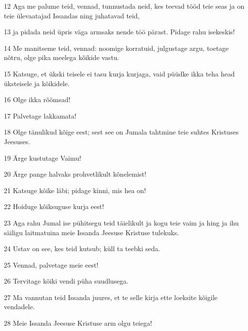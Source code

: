 \par 12 Aga me palume teid, vennad, tunnustada neid, kes teevad tööd teie seas ja on teie ülevaatajad Issandas ning juhatavad teid,
\par 13 ja pidada neid üpris väga armsaks nende töö pärast. Pidage rahu isekeskis!
\par 14 Me manitseme teid, vennad: noomige korratuid, julgustage argu, toetage nõtru, olge pika meelega kõikide vastu.
\par 15 Katsuge, et ükski teisele ei tasu kurja kurjaga, vaid püüdke ikka teha head üksteisele ja kõikidele.
\par 16 Olge ikka rõõmsad!
\par 17 Palvetage lakkamata!
\par 18 Olge tänulikud kõige eest; sest see on Jumala tahtmine teie suhtes Kristuses Jeesuses.
\par 19 Ärge kustutage Vaimu!
\par 20 Ärge pange halvaks prohvetlikult kõnelemist!
\par 21 Katsuge kõike läbi; pidage kinni, mis hea on!
\par 22 Hoiduge kõiksuguse kurja eest!
\par 23 Aga rahu Jumal ise pühitsegu teid täielikult ja kogu teie vaim ja hing ja ihu säiligu laitmatuina meie Issanda Jeesuse Kristuse tulekuks.
\par 24 Ustav on see, kes teid kutsub; küll ta teebki seda.
\par 25 Vennad, palvetage meie eest!
\par 26 Tervitage kõiki vendi püha suudlusega.
\par 27 Ma vannutan teid Issanda juures, et te selle kirja ette loeksite kõigile vendadele.
\par 28 Meie Issanda Jeesuse Kristuse arm olgu teiega!




